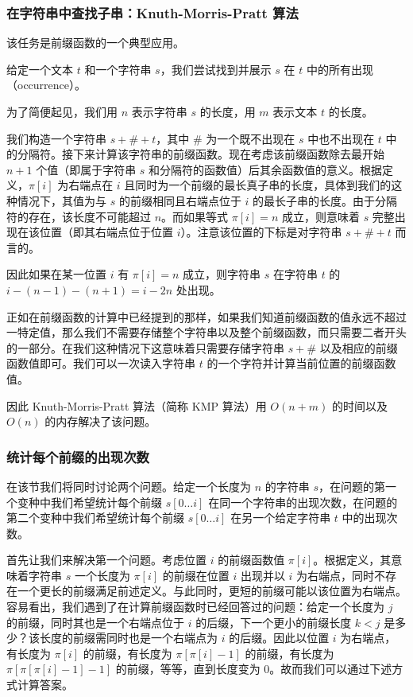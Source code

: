 \subsubsection{在字符串中查找子串：Knuth-Morris-Pratt 算法}

该任务是前缀函数的一个典型应用。

给定一个文本 $t$ 和一个字符串 $s$，我们尝试找到并展示 $s$ 在 $t$ 中的所有出现（occurrence）。

为了简便起见，我们用 $n$ 表示字符串 $s$ 的长度，用 $m$ 表示文本 $t$ 的长度。

我们构造一个字符串 $s + \# + t$，其中 $\#$ 为一个既不出现在 $s$ 中也不出现在 $t$ 中的分隔符。接下来计算该字符串的前缀函数。现在考虑该前缀函数除去最开始 $n + 1$ 个值（即属于字符串 $s$ 和分隔符的函数值）后其余函数值的意义。根据定义，$\pi[i]$ 为右端点在 $i$ 且同时为一个前缀的最长真子串的长度，具体到我们的这种情况下，其值为与 $s$ 的前缀相同且右端点位于 $i$ 的最长子串的长度。由于分隔符的存在，该长度不可能超过 $n$。而如果等式 $\pi[i] = n$ 成立，则意味着 $s$ 完整出现在该位置（即其右端点位于位置 $i$）。注意该位置的下标是对字符串 $s + \# + t$ 而言的。

因此如果在某一位置 $i$ 有 $\pi[i] = n$ 成立，则字符串 $s$ 在字符串 $t$ 的 $i - (n - 1) - (n + 1) = i - 2n$ 处出现。

正如在前缀函数的计算中已经提到的那样，如果我们知道前缀函数的值永远不超过一特定值，那么我们不需要存储整个字符串以及整个前缀函数，而只需要二者开头的一部分。在我们这种情况下这意味着只需要存储字符串 $s + \#$ 以及相应的前缀函数值即可。我们可以一次读入字符串 $t$ 的一个字符并计算当前位置的前缀函数值。

因此 Knuth-Morris-Pratt 算法（简称 KMP 算法）用 $O(n + m)$ 的时间以及 $O(n)$ 的内存解决了该问题。

\subsubsection{统计每个前缀的出现次数}

在该节我们将同时讨论两个问题。给定一个长度为 $n$ 的字符串 $s$，在问题的第一个变种中我们希望统计每个前缀 $s[0 \dots i]$ 在同一个字符串的出现次数，在问题的第二个变种中我们希望统计每个前缀 $s[0 \dots i]$ 在另一个给定字符串 $t$ 中的出现次数。

首先让我们来解决第一个问题。考虑位置 $i$ 的前缀函数值 $\pi[i]$。根据定义，其意味着字符串 $s$ 一个长度为 $\pi[i]$ 的前缀在位置 $i$ 出现并以 $i$ 为右端点，同时不存在一个更长的前缀满足前述定义。与此同时，更短的前缀可能以该位置为右端点。容易看出，我们遇到了在计算前缀函数时已经回答过的问题：给定一个长度为 $j$ 的前缀，同时其也是一个右端点位于 $i$ 的后缀，下一个更小的前缀长度 $k < j$ 是多少？该长度的前缀需同时也是一个右端点为 $i$ 的后缀。因此以位置 $i$ 为右端点，有长度为 $\pi[i]$ 的前缀，有长度为 $\pi[\pi[i] - 1]$ 的前缀，有长度为 $\pi[\pi[\pi[i] - 1] - 1]$ 的前缀，等等，直到长度变为 $0$。故而我们可以通过下述方式计算答案。


